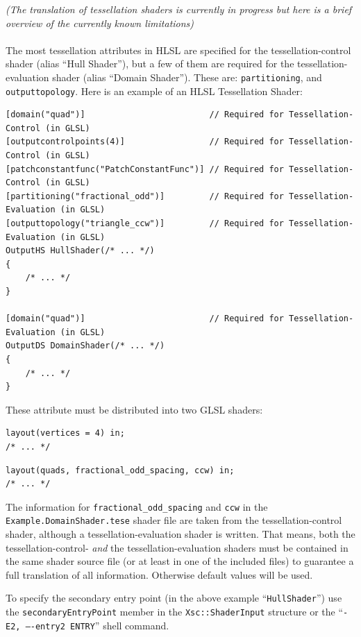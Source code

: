 \documentclass{article}
\begin{document}
\emph{(The translation of tessellation shaders is currently in progress but here is a brief overview
of the currently known limitations)}
\\
\\
The most tessellation attributes in HLSL are specified for the tessellation-control shader (alias ``Hull Shader''),
but a few of them are required for the tessellation-evaluation shader (alias ``Domain Shader'').
These are: \texttt{partitioning}, and \texttt{outputtopology}. Here is an example of an HLSL Tessellation Shader:
\begin{lstlisting}[title={\texttt{Example.hlsl}}]
[domain("quad")]                         // Required for Tessellation-Control (in GLSL)
[outputcontrolpoints(4)]                 // Required for Tessellation-Control (in GLSL)
[patchconstantfunc("PatchConstantFunc")] // Required for Tessellation-Control (in GLSL)
[partitioning("fractional_odd")]         // Required for Tessellation-Evaluation (in GLSL)
[outputtopology("triangle_ccw")]         // Required for Tessellation-Evaluation (in GLSL)
OutputHS HullShader(/* ... */)
{
	/* ... */
}

[domain("quad")]                         // Required for Tessellation-Evaluation (in GLSL)
OutputDS DomainShader(/* ... */)
{
	/* ... */
}
\end{lstlisting}
These attribute must be distributed into two GLSL shaders:
\begin{lstlisting}[title={\texttt{Example.HullShader.tesc}}]
layout(vertices = 4) in;
/* ... */
\end{lstlisting}
\begin{lstlisting}[title={\texttt{Example.DomainShader.tese}}]
layout(quads, fractional_odd_spacing, ccw) in;
/* ... */
\end{lstlisting}
The information for \texttt{fractional\_odd\_spacing} and \texttt{ccw} in the \texttt{Example.DomainShader.tese} shader file
are taken from the tessellation-control shader, although a tessellation-evaluation shader is written.
That means, both the tessellation-control- \emph{and} the tessellation-evaluation shaders must be contained
in the same shader source file (or at least in one of the included files) to guarantee a full translation of all information.
Otherwise default values will be used.

To specify the secondary entry point (in the above example ``\texttt{HullShader}'') use the
\texttt{secondaryEntryPoint} member in the \texttt{Xsc::ShaderInput} structure
or the ``\texttt{-E2, ----entry2 ENTRY}'' shell command.










\end{document}
